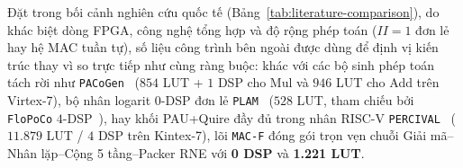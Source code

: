 

Đặt trong bối cảnh nghiên cứu quốc tế (Bảng~\ref{tab:literature-comparison}), do
khác biệt dòng FPGA, công nghệ tổng hợp và độ rộng phép toán ($II=1$ đơn lẻ hay
hệ MAC tuần tự), số liệu công trình bên ngoài được dùng để định vị kiến trúc thay
vì so trực tiếp như cùng ràng buộc: khác với các bộ sinh phép toán tách rời như
\texttt{PACoGen}~\cite{jaiswal2019pacogen} ($854$ LUT + $1$ DSP cho Mul và $946$ LUT
cho Add trên Virtex-7), bộ nhân logarit $0$-DSP đơn lẻ \texttt{PLAM}~\cite{murillo2021plam}
($528$ LUT, tham chiếu bởi \texttt{FloPoCo} $4$-DSP~\cite{murillo2020flopoco,murillo2022energy}),
hay khối PAU+Quire đầy đủ trong nhân RISC-V \texttt{PERCIVAL}~\cite{mallasen2022percival}
($11.879$ LUT / $4$ DSP trên Kintex-7), lõi \texttt{MAC-F} đóng gói trọn vẹn chuỗi
Giải mã--Nhân lặp--Cộng 5 tầng--Packer RNE với \textbf{0 DSP} và \textbf{1.221 LUT}.


